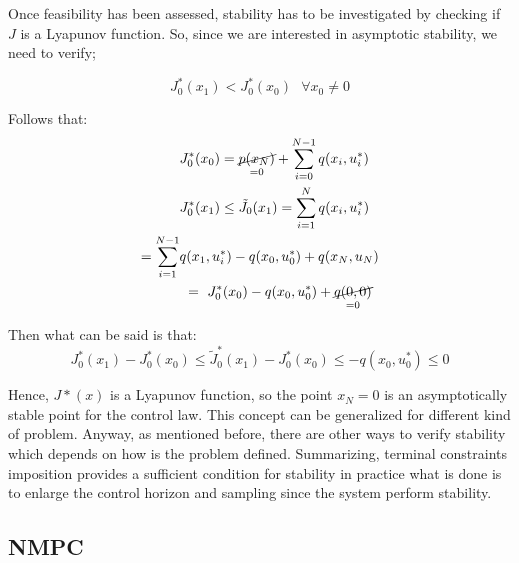 Once feasibility has been assessed, stability has to be investigated by checking if $J$ is a Lyapunov function. So, since we are interested in asymptotic stability, we need to verify;

\begin{equation}
J_0^*(x_1)<J_0^*(x_0)\ \ \ \forall x_0 \neq 0
\end{equation}

Follows that:
\begin{equation}
	\begin{split}
		&J_0^*(x_0)= \underset{=0}{\cancel{p(x_N)}}+\sum_{i=0}^{N-1} q(x_i,u_i^*) \\
		&J_0^*(x_1) \leq \tilde{J}_0(x_1)=\sum_{i=1}^{N}q(x_i,u_i^*) \\
		 = \sum_{i=1}^{N-1}&q(x_1,u_i^*)-q(x_0,u_0^*)+q(x_N,u_N) \\
		 &\ =\  J_0^*(x_0)-q(x_0,u_0^*)+\underset{=0}{\cancel{q(0,0)}} \\
	\end{split}
\end{equation}

Then what can be said is that:
\begin{equation}
	J_0^*(x_1)-J_0^*(x_0)\leq \tilde{J}_0^*(x_1) - J_0^*(x_0) \leq -q(x_0,u_0^*) \leq 0
\end{equation}

Hence, $J*(x)$ is a Lyapunov function, so the point $x_N=0$ is an asymptotically stable point for the control law. This concept can be generalized for different kind of problem. Anyway, as mentioned before, there are other ways to verify stability which depends on how is the problem defined. Summarizing, terminal constraints imposition provides a sufficient condition for stability in practice what is done is to enlarge the control horizon and sampling since the system perform stability. 

\subsection{NMPC}

